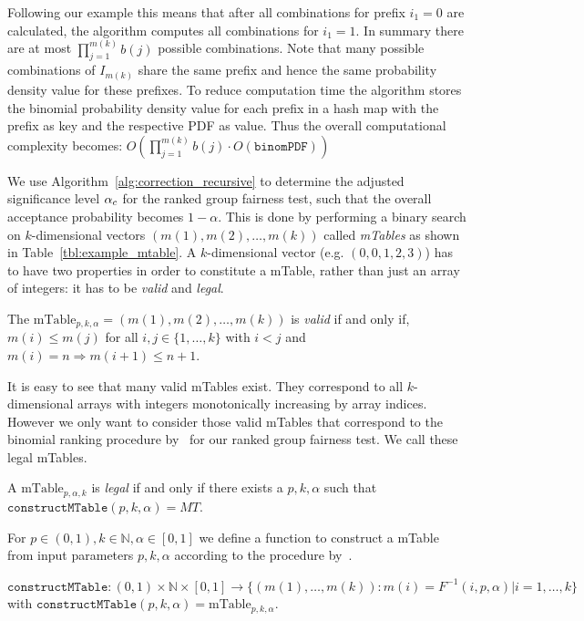 %
Following our example this means that after all combinations for prefix $i_1 = 0$ are calculated, the algorithm computes all combinations for $i_1 = 1$.
%
In summary there are at most $\prod_{j=1}^{m(k)}b(j)$ possible combinations.
%
Note that many possible combinations of $I_{m(k)}$ share the same prefix and hence the same probability density value for these prefixes.
%
To reduce computation time the algorithm stores the binomial probability density value for each prefix in a hash map with the prefix as key and the respective PDF as value.
%
Thus the overall computational complexity becomes: $O(\prod_{j=1}^{m(k)}b(j) \cdot O(\texttt{binomPDF}))$

We use Algorithm~\ref{alg:correction_recursive} to determine the adjusted significance level $\alpha_c$ for the ranked group fairness test, such that the overall acceptance probability becomes $1-\alpha$.
%
This is done by performing a binary search on $k$-dimensional vectors $(m(1), m(2), \ldots , m(k))$ called \textit{mTables} as shown in Table~\ref{tbl:example_mtable}.
%
A $k$-dimensional vector (e.g. $(0,0,1,2,3)$) has to have two properties in order to constitute a mTable, rather than just an array of integers: it has to be \emph{valid} and \emph{legal}.
%
\begin{definition}
	\label{def:valid-mtable}
	The $\text{mTable}_{p,k,\alpha}=(m(1) , m(2) , \ldots , m(k))$ is \emph{valid} if and only if, $m(i) \leq m(j)$ for all $i,j \in \lbrace 1, \ldots, k \rbrace$ with $i < j$ and $m(i)=n \Rightarrow m(i+1) \leq n+1$.
\end{definition}
\noindent It is easy to see that many valid mTables exist.
%
They correspond to all $k$-dimensional arrays with integers monotonically increasing by array indices.
%
However we only want to consider those valid mTables that correspond to the binomial ranking procedure by~\citet{yang2016measuring} for our ranked group fairness test.
%
We call these legal mTables.
%
\begin{definition}
	\label{def:legal-mtable}
	A $\text{mTable}_{p,\alpha,k}$ is \textit{legal} if and only if there exists a $p,k,\alpha$ such that
	$\texttt{constructMTable}(p,k,\alpha)=MT$.
\end{definition}
%
\begin{definition}[constructMTable]
\label{def:construct-mtable-single-test}
For $p\in(0,1), k \in \mathbb{N}, \alpha \in [0,1]$ we define a function to construct a mTable from input parameters $p, k, \alpha$ according to the procedure by~\citet{yang2016measuring}.

\noindent$\texttt{constructMTable} :(0,1) \times \mathbb{N} \times [0,1] \longrightarrow \lbrace (m(1) ,\ldots, m(k)): m(i) = F^{-1}(i,p,\alpha) | i = 1,\ldots,k\rbrace$ with $\texttt{constructMTable}(p,k,\alpha)=\text{mTable}_{p,k,\alpha}$.
\end{definition}
